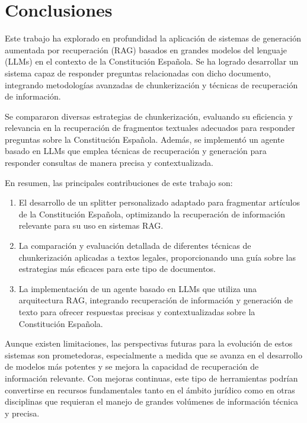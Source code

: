 
\chapter{Conclusiones}
\label{conclusiones}


Este trabajo ha explorado en profundidad la aplicación de sistemas de generación aumentada por recuperación (RAG) basados en grandes modelos del lenguaje (LLMs) en el contexto de la Constitución Española. Se ha logrado desarrollar un sistema capaz de responder preguntas relacionadas con dicho documento, integrando metodologías avanzadas de chunkerización y técnicas de recuperación de información.

Se compararon diversas estrategias de chunkerización, evaluando su eficiencia y relevancia en la recuperación de fragmentos textuales adecuados para responder preguntas sobre la Constitución Española. Además, se implementó un agente basado en LLMs que emplea técnicas de recuperación y generación para responder consultas de manera precisa y contextualizada.

En resumen, las principales contribuciones de este trabajo son:

\begin{enumerate}
\item El desarrollo de un splitter personalizado adaptado para fragmentar artículos de la Constitución Española, optimizando la recuperación de información relevante para su uso en sistemas RAG.
\item La comparación y evaluación detallada de diferentes técnicas de chunkerización aplicadas a textos legales, proporcionando una guía sobre las estrategias más eficaces para este tipo de documentos.
\item La implementación de un agente basado en LLMs que utiliza una arquitectura RAG, integrando recuperación de información y generación de texto para ofrecer respuestas precisas y contextualizadas sobre la Constitución Española.
\end{enumerate}

Aunque existen limitaciones, las perspectivas futuras para la evolución de estos sistemas son prometedoras, especialmente a medida que se avanza en el desarrollo de modelos más potentes y se mejora la capacidad de recuperación de información relevante. Con mejoras continuas, este tipo de herramientas podrían convertirse en recursos fundamentales tanto en el ámbito jurídico como en otras disciplinas que requieran el manejo de grandes volúmenes de información técnica y precisa.